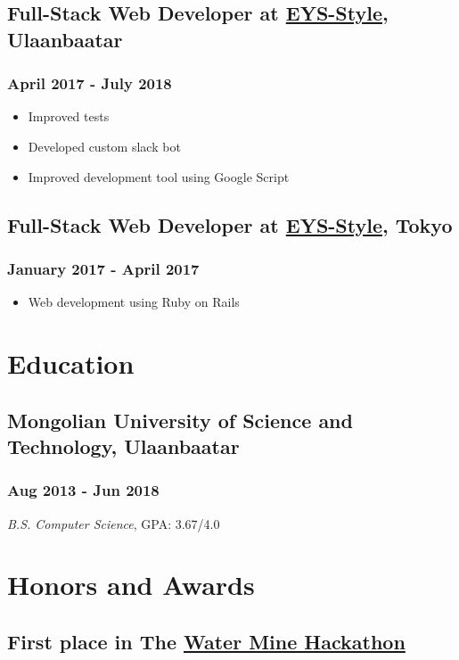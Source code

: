 \documentclass[letterpaper]{article}
\begin{document}
\subsection{Full-Stack Web Developer at \href{http:www.eys-style.com}{EYS-Style}, Ulaanbaatar}
\label{sec:org7dcdd93}
\subsubsection{April 2017 - July 2018}
\label{sec:org761afaf}
\begin{itemize}
\item Improved tests
\item Developed custom slack bot
\item Improved development tool using Google Script
\end{itemize}
\subsection{Full-Stack Web Developer at \href{http:www.eys-style.com}{EYS-Style}, Tokyo}
\label{sec:org6cacc28}
\subsubsection{January 2017 - April 2017}
\label{sec:org193bc7a}
\begin{itemize}
\item Web development using Ruby on Rails
\end{itemize}
\section{Education}
\label{sec:org0698345}
\subsection{Mongolian University of Science and Technology, Ulaanbaatar}
\label{sec:org8ba186d}
\subsubsection{Aug 2013 - Jun 2018}
\label{sec:orgb7972af}
\emph{B.S. Computer Science}, GPA: 3.67/4.0
\section{Honors and Awards}
\label{sec:orgd3b9f7d}
\subsection{First place in The \href{https://www.unread.today/c/2191}{Water Mine Hackathon}}
\label{sec:org36c74b5}
\end{document}
